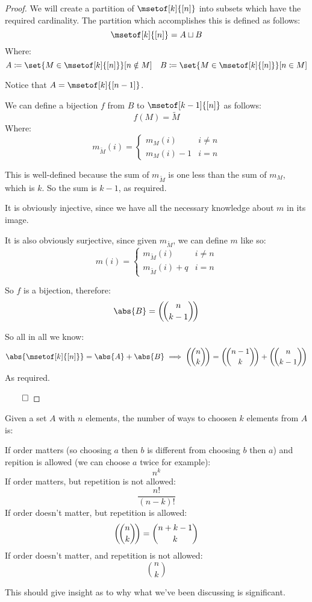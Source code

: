 \begin{proof}

	We will create a partition of $\msetof[k]{[n]}$ into subsets which have the required cardinality.
	The partition which accomplishes this is defined as follows:
	\[ \msetof[k]{[n]} = A\sqcup B \]
	Where:
	\[ A\coloneqq\set{M\in\msetof[k]{[n]}}[n\notin M] \quad B\coloneqq\set{M\in\msetof[k]{[n]}}[n\in M] \]

	Notice that $A=\msetof[k]{[n-1]}$.

	We can define a bijection $f$ from $B$ to $\msetof[k-1]{[n]}$ as follows:
	\[ f(M) = \tilde M \]
	Where:
	\[ m_{\tilde M}(i) = \begin{cases}
		m_M(i) & i\neq n \\
		m_M(i) - 1 & i=n 
	\end{cases} \]

	This is well-defined because the sum of $m_{\tilde M}$ is one less than the sum of $m_M$, which is $k$.
	So the sum is $k-1$, as required.

	It is obviously injective, since we have all the necessary knowledge about $m$ in its image.

	It is also obviously surjective, since given $m_{\tilde M}$, we can define $m$ like so:
	\[ m(i) = \begin{cases} m_{\tilde M}(i) & i\neq n \\ m_{\tilde M}(i) + q & i=n \end{cases} \]

	So $f$ is a bijection, therefore:
	\[ \abs{B} = \msetcoeff{n}{k-1} \]

	So all in all we know:
	\[ \abs{\msetof[k]{[n]}} = \abs{A} + \abs{B} \implies \msetcoeff{n}{k} = \msetcoeff{n-1}{k} + \msetcoeff{n}{k-1} \]
	As required.

\hfill$\qed$

\end{proof}

\newpage
\begin{thrm*}

	Given a set $A$ with $n$ elements, the number of ways to choosen $k$ elements from $A$ is:
	\begin{msecitemize}
		\mitem If order matters (so choosing $a$ then $b$ is different from choosing $b$ then $a$)
		and repition is allowed (we can choose $a$ twice for example):
			\[ n^k \]
		\mitem If order matters, but repetition is not allowed:
			\[ \frac{n!}{(n-k)!} \]
		\mitem If order doesn't matter, but repetition is allowed:
			\[ \left(\!\binom{n}{k}\!\right) = \binom{n+k-1}{k} \]
		\mitem If order doesn't matter, and repetition is not allowed:
			\[ \binom nk \]
	\end{msecitemize}

	This should give insight as to why what we've been discussing is significant.

\end{thrm*}

